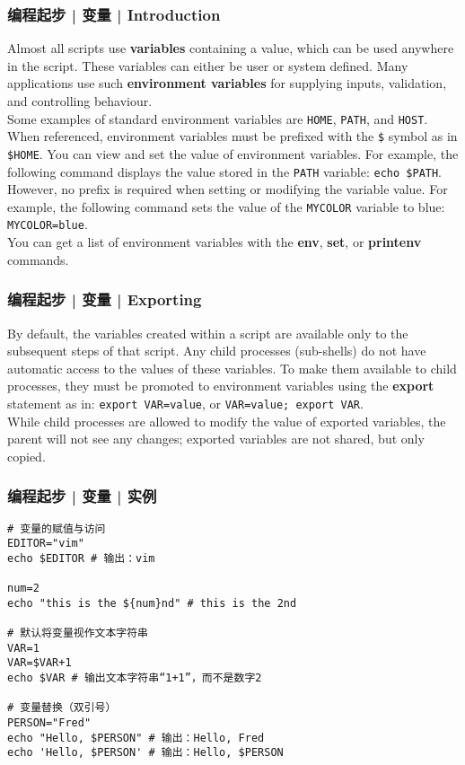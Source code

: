 \begin{frame}[fragile]
  \frametitle{编程起步 | 变量 | Introduction}
  Almost all scripts use \textbf{variables} containing a value, which can be used anywhere in the script. These variables can either be user or system defined. Many applications use such \textbf{environment variables} for supplying inputs, validation, and controlling behaviour.\\
  \vspace{0.2cm}
  Some examples of standard environment variables are \verb|HOME|, \verb|PATH|, and \verb|HOST|. When referenced, environment variables must be prefixed with the \verb|$| symbol as in \verb|$HOME|. You can view and set the value of environment variables. For example, the following command displays the value stored in the \verb|PATH| variable: \verb|echo $PATH|.\\
  \vspace{0.2cm}
  However, no prefix is required when setting or modifying the variable value. For example, the following command sets the value of the \verb|MYCOLOR| variable to blue: \verb|MYCOLOR=blue|.\\
  \vspace{0.2cm}
  You can get a list of environment variables with the \textbf{env}, \textbf{set}, or \textbf{printenv} commands.
\end{frame}

\begin{frame}[fragile]
  \frametitle{编程起步 | 变量 | Exporting}
  By default, the variables created within a script are available only to the subsequent steps of that script. Any child processes (sub-shells) do not have automatic access to the values of these variables. To make them available to child processes, they must be promoted to environment variables using the \textbf{export} statement as in: \verb|export VAR=value|, or \verb|VAR=value; export VAR|.\\
  \vspace{0.2cm}
  While child processes are allowed to modify the value of exported variables, the parent will not see any changes; exported variables are not shared, but only copied.
\end{frame}
  
\begin{frame}[fragile]
  \frametitle{编程起步 | 变量 | \alert{实例}}
\begin{lstlisting}
# 变量的赋值与访问
EDITOR="vim"
echo $EDITOR # 输出：vim

num=2
echo "this is the ${num}nd" # this is the 2nd

# 默认将变量视作文本字符串
VAR=1
VAR=$VAR+1
echo $VAR # 输出文本字符串“1+1”，而不是数字2

# 变量替换（双引号）
PERSON="Fred"
echo "Hello, $PERSON" # 输出：Hello, Fred
echo 'Hello, $PERSON' # 输出：Hello, $PERSON
\end{lstlisting}
\end{frame}

